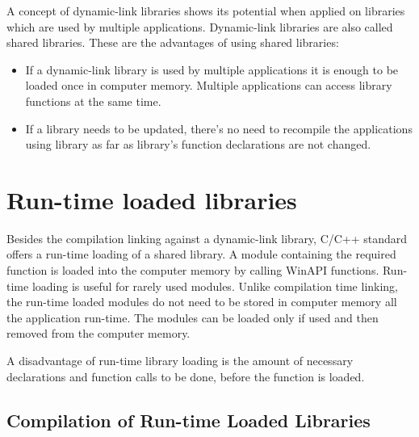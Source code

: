

A concept of dynamic-link libraries shows its potential when applied on libraries which are used by multiple applications. Dynamic-link libraries are also called shared libraries. These are the advantages of using shared libraries:

\begin{itemize}
\item If a dynamic-link library is used by multiple applications it is enough to be loaded once in computer memory. Multiple applications can access library functions at the same time.
\item If a library needs to be updated, there's no need to recompile the applications using library as far as library's function declarations are not changed.
\end{itemize}


\section{Run-time loaded libraries}

Besides the compilation linking against a dynamic-link library, C/C++ standard offers a run-time loading of a shared library. A module containing the required function is loaded into the computer memory by calling WinAPI functions. Run-time loading is useful for rarely used modules. Unlike compilation time linking, the run-time loaded modules do not need to be stored in computer memory all the application run-time. The modules can be loaded only if used and then removed from the computer memory.

A disadvantage of run-time library loading is the amount of necessary declarations and function calls to be done, before the function is loaded.

\subsection{Compilation of Run-time Loaded Libraries}


